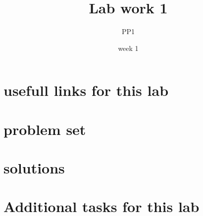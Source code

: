\documentclass[12pt]{article}%
\begin{document}
    \title{Lab work 1}
    \date{week 1}
    \author{PP1}
    \maketitle
    \section{usefull links for this lab}
    \section{problem set}
    
    
    
    
    

    \section{solutions}
    
    
    
    
    

    \section{Additional tasks for this lab}
    
\end{document}
